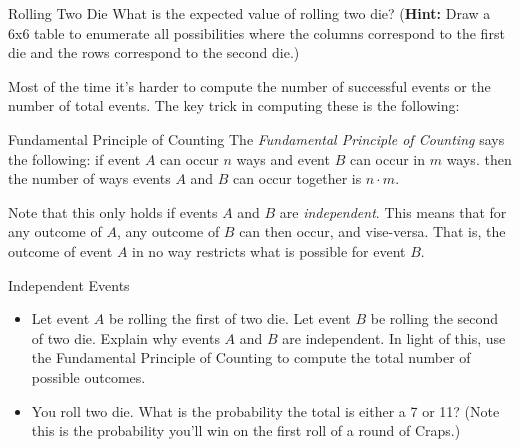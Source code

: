 \begin{exercise}{Rolling Two Die \Coffeecup \Coffeecup}
 What is the expected value of rolling two die?  ({\bf Hint:} Draw a 6x6 table to enumerate all possibilities where the columns correspond to the first die and the rows correspond to the second die.) 

\vspace*{2in}

\end{exercise}

Most of the time it's harder to compute the number of successful events or the number of total events.  The key trick in computing these is the following: 

\begin{theorem}{Fundamental Principle of Counting}
The \emph{Fundamental Principle of Counting} says the following: if event $A$ can occur $n$ ways and event $B$ can occur in $m$ ways. then  the number of ways events $A$ and $B$ can occur together is $n\cdot m$.  

\end{theorem}

Note that this only holds if events $A$ and $B$ are \emph{independent}. This means that for any outcome of $A$, any outcome of $B$ can then occur, and vise-versa.  That is, the outcome of event $A$ in no way restricts what is possible for event $B$.

\begin{exercise}{Independent Events \Coffeecup \Coffeecup}
\begin{itemize}
\item Let event $A$ be rolling the first of two die.  Let event $B$ be rolling the second of two die.  Explain why events $A$ and $B$ are independent.  In light of this, use the Fundamental Principle of Counting to compute the total number of possible outcomes.
\vspace*{1in}
\item You roll two die.  What is the probability the total is either a 7 or 11?  (Note this is the probability you'll win on the first roll of a round of Craps.)
\vspace*{1in}
\end{itemize}
\end{exercise}

